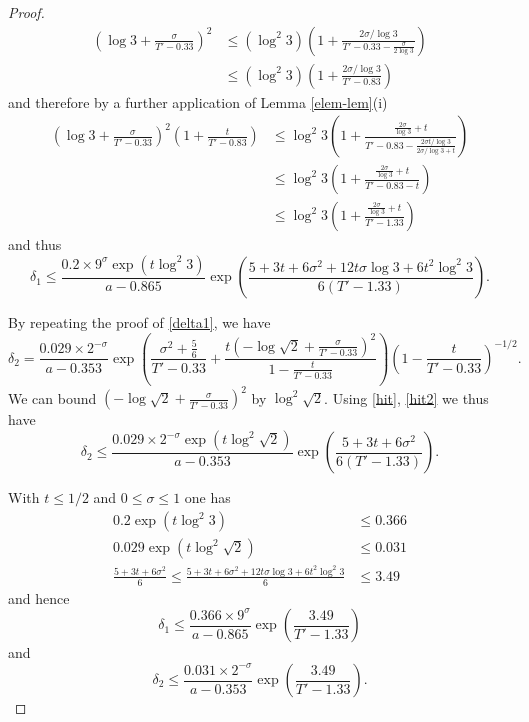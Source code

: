 \documentclass[a4paper,11pt,twoside]{amsart}
\begin{document}
\begin{proof}
\begin{align*}
\left(\log 3 + \frac{\sigma}{T'-0.33}\right)^2 &\leq (\log^2 3) \left(1 + \frac{2 \sigma / \log 3}{T' - 0.33 - \frac{\sigma}{2\log 3}}\right) \\
&\leq  (\log^2 3) \left(1 + \frac{2 \sigma / \log 3}{T' - 0.83}\right)
\end{align*}
and therefore by a further application of Lemma \ref{elem-lem}(i)
\begin{align*}
\left(\log 3 + \frac{\sigma}{T'-0.33}\right)^2 \left(1 + \frac{t}{T'-0.83}\right) 
&\leq \log^2 3 \left(1 + \frac{\frac{2 \sigma}{\log 3} + t}{T' - 0.83 - \frac{2\sigma t/\log 3}{2\sigma/\log 3 + t}}\right) \\
&\leq \log^2 3 \left(1 + \frac{\frac{2 \sigma}{\log 3} + t}{T' - 0.83 - t}\right) \\
&\leq \log^2 3 \left(1 + \frac{\frac{2 \sigma}{\log 3} + t}{T' - 1.33}\right) 
\end{align*}
and thus
$$ \delta_1 \leq \frac{0.2 \times 9^\sigma \exp( t \log^2 3 )}{a-0.865} \exp\left( \frac{5+3t+6\sigma^2 + 12 t \sigma \log 3 + 6t^2 \log^2 3}{6(T'-1.33)} \right).$$

By repeating the proof of \eqref{delta1}, we have
$$
 \delta_2 = \frac{0.029 \times 2^{-\sigma}}{a - 0.353} \exp\left( \frac{\sigma^2 + \frac{5}{6}}{T'-0.33} + \frac{t\left(-\log \sqrt{2} + \frac{\sigma}{T'-0.33}\right)^2}{1 - \frac{t}{T'-0.33}} \right) \left(1 - \frac{t}{T'-0.33}\right)^{-1/2}.$$
We can bound $(-\log \sqrt{2} + \frac{\sigma}{T'-0.33})^2$ by $\log^2 \sqrt{2}$.  Using \eqref{hit}, \eqref{hit2} we thus have
$$
 \delta_2 \leq \frac{0.029 \times 2^{-\sigma} \exp( t \log^2 \sqrt{2})}{a - 0.353} \exp\left( \frac{5 + 3t + 6\sigma^2}{6(T'-1.33)} \right).
$$

With $t \leq 1/2$ and $0 \leq \sigma \leq 1$ one has
\begin{align*}
 0.2 \exp(t \log^2 3) &\leq 0.366 \\
0.029 \exp( t \log^2 \sqrt{2}) &\leq 0.031 \\
\frac{5 + 3t + 6\sigma^2}{6} \leq \frac{5 + 3t + 6\sigma^2 + 12 t \sigma \log 3 + 6t^2 \log^2 3}{6} &\leq 3.49
\end{align*}
and hence
$$ \delta_1 \leq \frac{0.366 \times 9^\sigma}{a-0.865} \exp\left( \frac{3.49}{T'-1.33} \right)$$
and
$$ \delta_2 \leq \frac{0.031 \times 2^{-\sigma}}{a-0.353} \exp\left( \frac{3.49}{T'-1.33} \right).$$


\end{proof}
\end{document}
